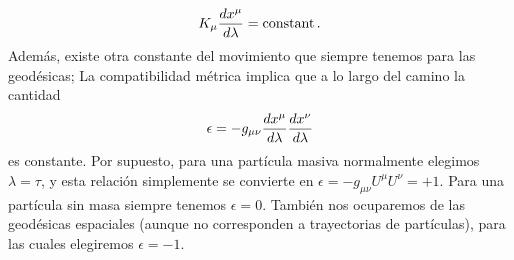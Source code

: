 \documentclass[11pt,b5paper,openany,twoside]{book}
\newcommand{\mn}{{\mu\nu}}
\begin{document}
\begin{equation}
K_\mu {{dx^\mu}\over{d\lambda}} = {\rm constant}\,.\label{7.38}
\end{equation}
Además, existe otra constante del movimiento que siempre tenemos para las geodésicas; La compatibilidad métrica implica que a lo largo del camino la cantidad
\begin{equation}
\epsilon = -g_\mn {{dx^\mu}\over{d\lambda}}{{dx^\nu}\over{d\lambda}}
\label{7.39}
\end{equation}
es constante.
Por supuesto, para una partícula masiva normalmente elegimos $\lambda = \tau$, y esta relación simplemente se convierte en $\epsilon = -g_\mn U^\mu U^\nu=+1$.
Para una partícula sin masa siempre tenemos $\epsilon =0$.
También nos ocuparemos de las geodésicas espaciales (aunque no corresponden a trayectorias de partículas), para las cuales elegiremos $\epsilon = -1$.
\end{document}
